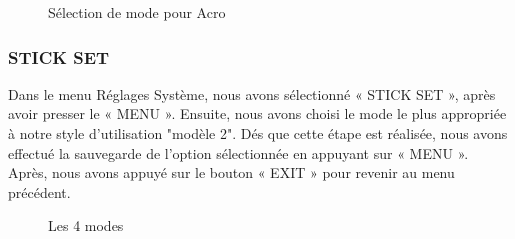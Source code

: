 \begin{figure}[H]
	\begin{center}
		\centering
	\end{center}
	\caption{Sélection de mode pour Acro}
\end{figure}
	\subsubsection{STICK SET }
	Dans le menu Réglages Système, nous avons sélectionné « STICK SET », après avoir presser le « MENU ». Ensuite, nous avons choisi le mode le plus appropriée à notre style d'utilisation "modèle 2". Dés que cette étape est réalisée, nous avons effectué la sauvegarde de l'option sélectionnée en appuyant sur « MENU ». Après, nous avons appuyé sur le bouton « EXIT » pour revenir au menu précédent.
	\begin{figure}[H]
		\begin{center}
			\centering
		\end{center}
		\caption{Les 4 modes}
	\end{figure}

